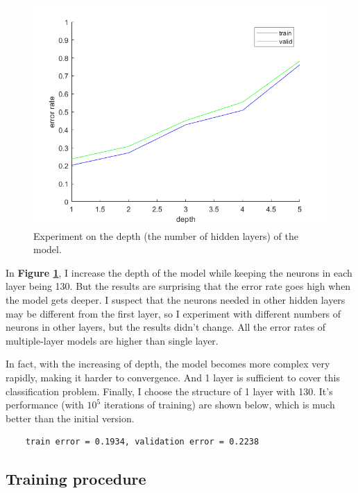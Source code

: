 \documentclass{article}
\begin{document}
\begin{figure}[H]
	\centering
	\includegraphics[scale=0.5]{figure3}
	\caption{Experiment on the depth (the number of hidden layers) of the model.}
	\label{fig3}
\end{figure}

In \textbf{Figure \ref{fig3}}, I increase the depth of the model while keeping the neurons in each layer being 130. But the results are surprising that the error rate goes high when the model gets deeper. I suspect that the neurons needed in other hidden layers may be different from the first layer, so I experiment with different numbers of neurons in other layers, but the results didn't change. All the error rates of multiple-layer models are higher than single layer.

In fact, with the increasing of depth, the model becomes more complex very rapidly, making it harder to convergence. And 1 layer is sufficient to cover this classification problem. Finally, I choose the structure of 1 layer with 130. It's performance (with $10^5$ iterations of training) are shown below, which is much better than the initial version.

\begin{commandline}
	\begin{verbatim}
	train error = 0.1934, validation error = 0.2238
	\end{verbatim}
\end{commandline}

\subsection{Training procedure}
\end{document}
